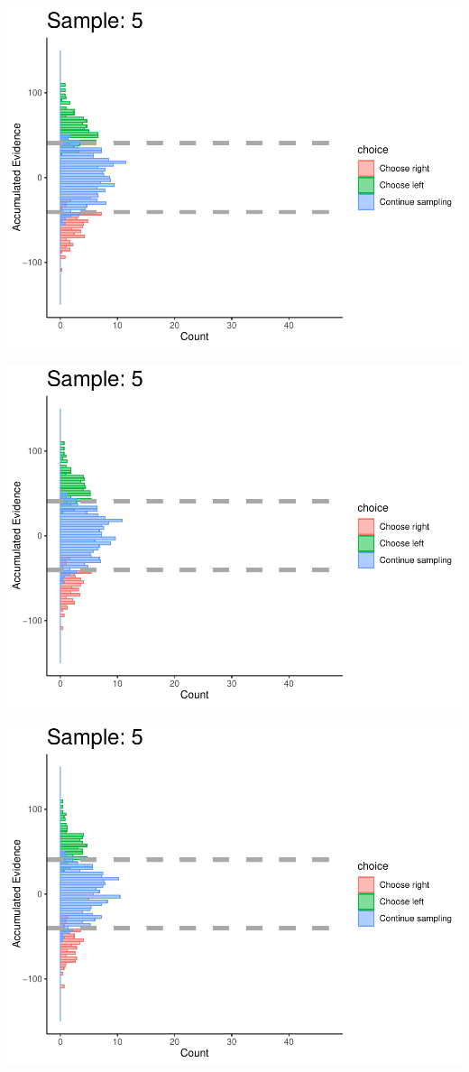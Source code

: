 \documentclass[
]{book}
\begin{document}
\begin{center}\includegraphics[width=0.8\linewidth]{LateNightBayes_files/figure-latex/collapsing_check-47} \end{center}

\begin{center}\includegraphics[width=0.8\linewidth]{LateNightBayes_files/figure-latex/collapsing_check-48} \end{center}

\begin{center}\includegraphics[width=0.8\linewidth]{LateNightBayes_files/figure-latex/collapsing_check-49} \end{center}
\end{document}

